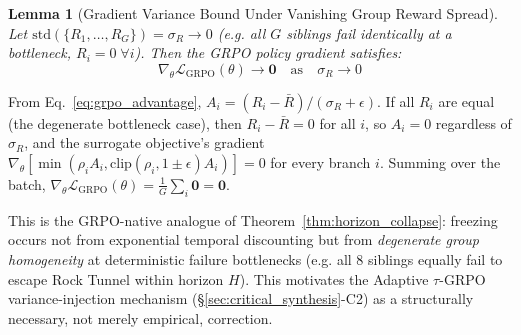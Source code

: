 \documentclass[journal,10pt,twocolumn]{IEEEtran}
\newtheorem{lemma}{Lemma}
\begin{document}
\begin{lemma}[Gradient Variance Bound Under Vanishing Group Reward Spread]
\label{lemma:grpo_variance}
Let $\text{std}(\{R_1, \dots, R_G\}) = \sigma_R \to 0$ (e.g. all $G$ siblings fail identically at a bottleneck, $R_i = 0 \; \forall i$). Then the GRPO policy gradient satisfies:
\begin{equation}
\nabla_\theta \mathcal{L}_{\text{GRPO}}(\theta) \to \mathbf{0} \quad \text{as} \quad \sigma_R \to 0
\end{equation}
\end{lemma}
\begin{IEEEproof}
From Eq.~\eqref{eq:grpo_advantage}, $A_i = (R_i - \bar{R})/(\sigma_R + \epsilon)$. If all $R_i$ are equal (the degenerate bottleneck case), then $R_i - \bar{R} = 0$ for all $i$, so $A_i = 0$ regardless of $\sigma_R$, and the surrogate objective's gradient $\nabla_\theta \left[\min(\rho_i A_i, \text{clip}(\rho_i, 1\pm\epsilon)A_i)\right] = 0$ for every branch $i$. Summing over the batch, $\nabla_\theta \mathcal{L}_{\text{GRPO}}(\theta) = \frac{1}{G}\sum_i \mathbf{0} = \mathbf{0}$.
\end{IEEEproof}
This is the GRPO-native analogue of Theorem~\ref{thm:horizon_collapse}: freezing occurs not from exponential temporal discounting but from \emph{degenerate group homogeneity} at deterministic failure bottlenecks (e.g. all 8 siblings equally fail to escape Rock Tunnel within horizon $H$). This motivates the Adaptive $\tau$-GRPO variance-injection mechanism (\S\ref{sec:critical_synthesis}-C2) as a structurally necessary, not merely empirical, correction.
\end{document}
